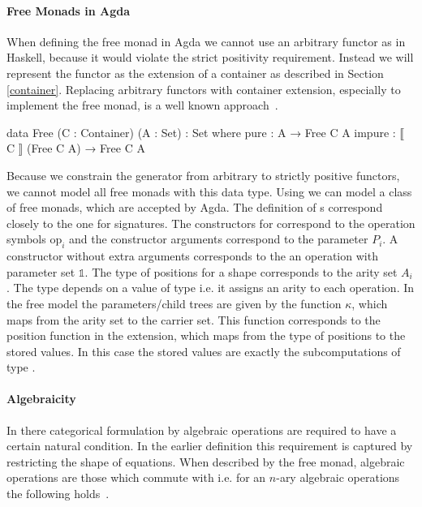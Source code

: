 

\paragraph{Free Monads in Agda}
When defining the free monad in Agda we cannot use an arbitrary functor as in
Haskell, because it would violate the strict positivity requirement.
Instead we will represent the functor as the extension of a container as
described in Section \ref{container}.
Replacing arbitrary functors with container extension, especially to implement
the free monad, is a well known
approach~\cite{DBLP:journals/programming/DylusCT19,DBLP:conf/haskell/ChristiansenDB19,DBLP:conf/mpc/McBride15}.

\begin{code}
data Free (C : Container) (A : Set) : Set where
  pure    : A → Free C A
  impure  : ⟦ C ⟧ (Free C A) → Free C A
\end{code}
Because we constrain the generator from arbitrary to strictly positive functors,
we cannot model all free monads with this data type.
Using  we can model a class of free monads, which are
accepted by Agda.
The definition of s correspond closely to the one for
signatures.
The constructors for  correspond to the operation symbols
$\mathrm{op}_i$ and the constructor arguments correspond to the parameter $P_i$.
A constructor without extra arguments corresponds to the an operation with
parameter set $\mathbb{1}$.
The type of positions for a shape corresponds to the arity set $A_i$.
The  type depends on a value of type  i.e. it
assigns an arity to each operation.
In the free model the parameters/child trees are given by the function $\kappa$,
which maps from the arity set to the carrier set.
This function corresponds to the position function in the
 extension, which maps from the type of positions to the
stored values.
In this case the stored values are exactly the subcomputations of type
\AgdaSpace{}\AgdaSpace{}.

\paragraph{Algebraicity}
In there categorical formulation by \textcite{DBLP:conf/fossacs/PlotkinP02}
algebraic operations are required to have a certain natural condition.
In the earlier definition this requirement is captured by restricting the shape
of equations.
When described by the free monad, algebraic operations are those which commute
with \AgdaFunction{>>=} i.e. for an $n$-ary algebraic operations the following
holds~\cite{DBLP:conf/lics/PirogSWJ18}.

